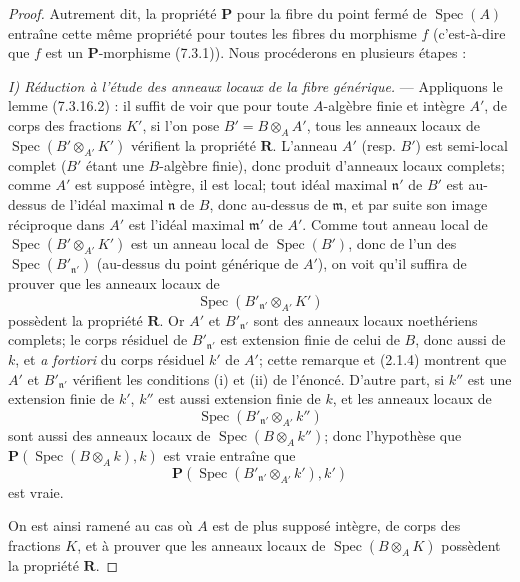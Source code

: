 \begin{proof}
Autrement dit, la propriété $\boldsymbol P$ pour la fibre du point fermé de
$\operatorname{Spec}(A)$ entraîne cette même propriété pour toutes les
fibres du morphisme $f$ (c'est-à-dire que $f$ est un
$\boldsymbol P$-morphisme (7.3.1)). Nous procéderons en plusieurs étapes :

\emph{I) Réduction à l'étude des anneaux locaux de la fibre générique.} ---
Appliquons le lemme (7.3.16.2) : il suffit de voir que pour toute
$A$-algèbre finie et intègre $A'$, de corps des fractions $K'$, si l'on
pose $B'=B\otimes_A A'$, tous les anneaux locaux de
$\operatorname{Spec}(B'\otimes_{A'}K')$ vérifient la propriété
$\boldsymbol R$. L'anneau $A'$ (resp. $B'$) est semi-local complet ($B'$
étant une $B$-algèbre finie), donc produit d'anneaux locaux complets; comme
$A'$ est supposé intègre, il est local; tout idéal maximal $\mathfrak n'$ de
$B'$ est au-dessus de l'idéal maximal $\mathfrak n$ de $B$, donc au-dessus
de $\mathfrak m$, et par suite son image réciproque dans $A'$ est l'idéal
maximal $\mathfrak m'$ de $A'$. Comme tout anneau local de
$\operatorname{Spec}(B'\otimes_{A'}K')$ est un anneau local de
$\operatorname{Spec}(B')$, donc de l'un des
$\operatorname{Spec}(B'_{\mathfrak n'})$ (au-dessus du point générique de
$A'$), on voit qu'il suffira de prouver que les anneaux locaux de
\[
\operatorname{Spec}(B'_{\mathfrak n'}\otimes_{A'}K')
\]
possèdent la propriété $\boldsymbol R$. Or $A'$ et
$B'_{\mathfrak n'}$ sont des anneaux locaux noethériens complets; le corps
résiduel de $B'_{\mathfrak n'}$ est extension finie de celui de $B$, donc
aussi de $k$, et \emph{a fortiori} du corps résiduel $k'$ de $A'$; cette
remarque et (2.1.4) montrent que $A'$ et $B'_{\mathfrak n'}$ vérifient les
conditions (i) et (ii) de l'énoncé. D'autre part, si $k''$ est une extension
finie de $k'$, $k''$ est aussi extension finie de $k$, et les anneaux locaux
de
\[
\operatorname{Spec}(B'_{\mathfrak n'}\otimes_{A'}k'')
\]
sont aussi des anneaux locaux de $\operatorname{Spec}(B\otimes_A k'')$;
donc l'hypothèse que
$\boldsymbol P(\operatorname{Spec}(B\otimes_A k),k)$ est vraie entraîne que
\[
\boldsymbol P(\operatorname{Spec}(B'_{\mathfrak n'}\otimes_{A'}k'),k')
\]
est vraie.

On est ainsi ramené au cas où $A$ est de plus supposé intègre, de corps des
fractions $K$, et à prouver que les anneaux locaux de
$\operatorname{Spec}(B\otimes_A K)$ possèdent la propriété
$\boldsymbol R$.


\end{proof}
